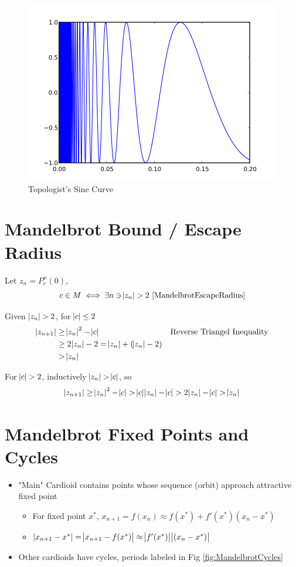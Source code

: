 \documentclass{article}
\begin{document}
\begin{figure}[!htbp]
    \centering
    \includegraphics[width=.4\linewidth]{images/420px-Topologist_sine_curve.png}
    \caption{Topologist's Sine Curve \cite{TopSineCurve}}%
\end{figure}



\section{Mandelbrot Bound / Escape Radius}

Let $z_n = P_c^n(0)$,
\[ c \in M \iff \exists n \ni \abs{z_n} > 2\ \text{\cite{MandelbrotEscapeRadius}}\]

Given $\abs{z_n} > 2$, for $\abs{c} \leq 2$
\begin{align*}
    \abs{z_{n+1}} &\geq \abs{z_n}^2 - \abs{c} &&\text{Reverse Triangel Inequality} \\
    &\geq 2\abs{z_n} - 2 = \abs{z_n} + (\abs{z_n} - 2) \\
    &> \abs{z_n}
\end{align*}

For $\abs{c} > 2$, inductively $\abs{z_n} > \abs{c}$, so
\[ \abs{z_{n+1}} \geq \abs{z_n}^2 - \abs{c} > \abs{c}\abs{z_n} - \abs{c} > 2\abs{z_n} - \abs{c} > \abs{z_n} \] 


\section{Mandelbrot Fixed Points and Cycles}

\begin{itemize}
    \item "Main" Cardioid contains points whose sequence (orbit) approach attractive fixed point
    \begin{itemize}
        \item For fixed point $x^*$, $x_{n+1} = f(x_n) \approx f(x^*) + f'(x^*)(x_n - x^*)$
        \item $\abs{x_{n + 1} - x^*} = \abs{x_{n+1} - f(x^*)} \approx \abs{f'(x^*)}\abs{(x_n - x^*)}$
    \end{itemize}
    \item Other cardioids have cycles, periods labeled in Fig \ref{fig:MandelbrotCycles}
\end{itemize}
\end{document}
